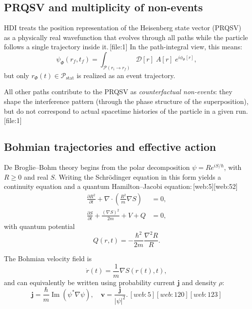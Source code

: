 \documentclass[11pt]{article}
\begin{document}
\subsection{PRQSV and multiplicity of non-events}

HDI treats the position representation of the Heisenberg state vector (PRQSV) as a physically real wavefunction that evolves through all paths while the particle follows a single trajectory inside it.\,[file:1]
In the path-integral view, this means:
\begin{equation}
\psi_\Phi(r_f,t_f) = \int_{\mathcal{P}(r_i\to r_f)} \mathcal{D}[r]\; A[r]\; e^{i\phi_\Phi[r]},
\end{equation}
but only \(r_\Phi(t)\in\mathcal{P}_{\mathrm{stat}}\) is realized as an event trajectory.

All other paths contribute to the PRQSV as \emph{counterfactual non-events}: they shape the interference pattern (through the phase structure of the superposition), but do not correspond to actual spacetime histories of the particle in a given run.\,[file:1]

\subsection{Bohmian trajectories and effective action}

De Broglie--Bohm theory begins from the polar decomposition \(\psi = R e^{iS/\hbar}\), with \(R\ge 0\) and real \(S\).
Writing the Schr\"odinger equation in this form yields a continuity equation and a quantum Hamilton--Jacobi equation:\,[web:5][web:52]
\begin{align}
\frac{\partial R^2}{\partial t} + \nabla\cdot\left(\frac{R^2}{m}\nabla S\right) &= 0,\\
\frac{\partial S}{\partial t} + \frac{(\nabla S)^2}{2m} + V + Q &= 0,
\end{align}
with quantum potential
\begin{equation}
Q(r,t) = -\frac{\hbar^2}{2m} \frac{\nabla^2 R}{R}.
\end{equation}

The Bohmian velocity field is
\begin{equation}
\dot r(t) = \frac{1}{m}\nabla S(r(t),t),
\end{equation}
and can equivalently be written using probability current \(\mathbf j\) and density \(\rho\):
\begin{equation}
\mathbf j = \frac{\hbar}{m}\operatorname{Im}(\psi^* \nabla\psi),\quad
\mathbf v = \frac{\mathbf j}{|\psi|^2}.\,[web:5][web:120][web:123]
\end{equation}
\end{document}
